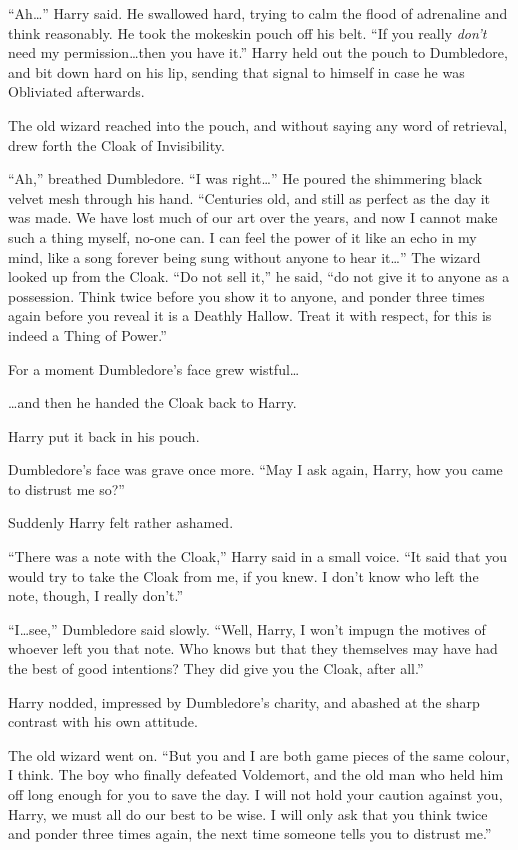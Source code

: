 “Ah…” Harry said. He swallowed hard, trying to calm the flood of adrenaline and think reasonably. He took the mokeskin pouch off his belt.
“If you really \emph{don’t} need my permission…then you have it.” Harry held out the pouch to Dumbledore, and bit down hard on his lip, sending that signal to himself in case he was Obliviated afterwards.

The old wizard reached into the pouch, and without saying any word of retrieval, drew forth the Cloak of Invisibility.

“Ah,” breathed Dumbledore.
“I was right…” He poured the shimmering black velvet mesh through his hand.
“Centuries old, and still as perfect as the day it was made. We have lost much of our art over the years, and now I cannot make such a thing myself, no-one can. I can feel the power of it like an echo in my mind, like a song forever being sung without anyone to hear it…” The wizard looked up from the Cloak.
“Do not sell it,” he said, “do not give it to anyone as a possession. Think twice before you show it to anyone, and ponder three times again before you reveal it is a Deathly Hallow. Treat it with respect, for this is indeed a Thing of Power.”

For a moment Dumbledore’s face grew wistful…

…and then he handed the Cloak back to Harry.

Harry put it back in his pouch.

Dumbledore’s face was grave once more.
“May I ask again, Harry, how you came to distrust me so?”

Suddenly Harry felt rather ashamed.

“There was a note with the Cloak,” Harry said in a small voice.
“It said that you would try to take the Cloak from me, if you knew. I don’t know who left the note, though, I really don’t.”

“I…see,” Dumbledore said slowly.
“Well, Harry, I won’t impugn the motives of whoever left you that note. Who knows but that they themselves may have had the best of good intentions? They did give you the Cloak, after all.”

Harry nodded, impressed by Dumbledore’s charity, and abashed at the sharp contrast with his own attitude.

The old wizard went on.
“But you and I are both game pieces of the same colour, I think. The boy who finally defeated Voldemort, and the old man who held him off long enough for you to save the day. I will not hold your caution against you, Harry, we must all do our best to be wise. I will only ask that you think twice and ponder three times again, the next time someone tells you to distrust me.”

